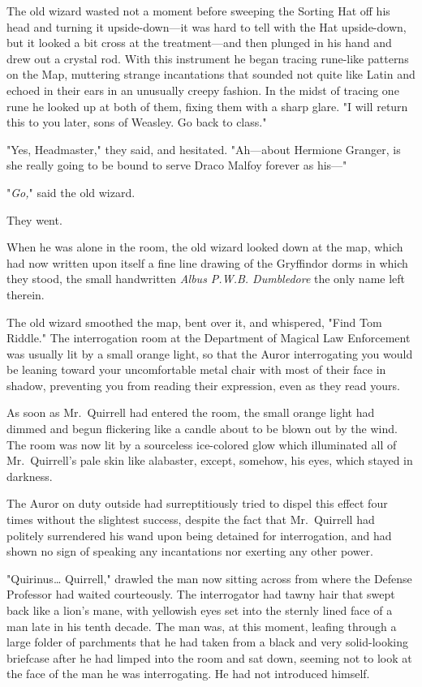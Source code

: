 The old wizard wasted not a moment before sweeping the Sorting Hat off his head and turning it upside-down---it was hard to tell with the Hat upside-down, but it looked a bit cross at the treatment---and then plunged in his hand and drew out a crystal rod. With this instrument he began tracing rune-like patterns on the Map, muttering strange incantations that sounded not quite like Latin and echoed in their ears in an unusually creepy fashion. In the midst of tracing one rune he looked up at both of them, fixing them with a sharp glare. "I will return this to you later, sons of Weasley. Go back to class."

"Yes, Headmaster," they said, and hesitated. "Ah---about Hermione Granger, is she really going to be bound to serve Draco Malfoy forever as his---"

"\emph{Go,}" said the old wizard.

They went.

When he was alone in the room, the old wizard looked down at the map, which had now written upon itself a fine line drawing of the Gryffindor dorms in which they stood, the small handwritten \emph{Albus P.W.B. Dumbledore} the only name left therein.

The old wizard smoothed the map, bent over it, and whispered, "Find Tom Riddle."
\sbreak
The interrogation room at the Department of Magical Law Enforcement was usually lit by a small orange light, so that the Auror interrogating you would be leaning toward your uncomfortable metal chair with most of their face in shadow, preventing you from reading their expression, even as they read yours.

As soon as Mr.~Quirrell had entered the room, the small orange light had dimmed and begun flickering like a candle about to be blown out by the wind. The room was now lit by a sourceless ice-colored glow which illuminated all of Mr.~Quirrell's pale skin like alabaster, except, somehow, his eyes, which stayed in darkness.

The Auror on duty outside had surreptitiously tried to dispel this effect four times without the slightest success, despite the fact that Mr.~Quirrell had politely surrendered his wand upon being detained for interrogation, and had shown no sign of speaking any incantations nor exerting any other power.

"Quirinus{\ldots} Quirrell," drawled the man now sitting across from where the Defense Professor had waited courteously. The interrogator had tawny hair that swept back like a lion's mane, with yellowish eyes set into the sternly lined face of a man late in his tenth decade. The man was, at this moment, leafing through a large folder of parchments that he had taken from a black and very solid-looking briefcase after he had limped into the room and sat down, seeming not to look at the face of the man he was interrogating. He had not introduced himself.

